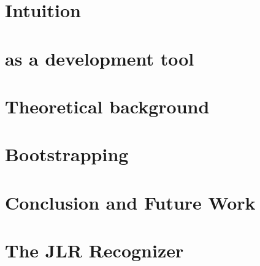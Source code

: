 \documentclass[nonatbib,preprint,numbers]{sigplanconf}
\begin{document}
\section{Intuition}
\label{Section:recognizer}


\section{\Fajita as a development tool}
\label{Section:proposal}


\section{Theoretical background}
\label{Section:theoretical-background}


\section{Bootstrapping \Fajita}
\label{Section:bootstrapping}


\section{Conclusion and Future Work}
\label{Section:zz}


\small


\clearpage
\appendix
\section{The JLR Recognizer}

\end{document}
